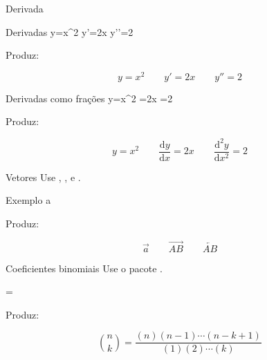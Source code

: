 \begin{frame}{Derivada}
	\begin{Codigo}{Derivadas}
		y=x\string^2  y'=2x  y'{}'=2
	\end{Codigo}
	
	\pause
	Produz:
	
	\begin{Resultado}{}
		\[y=x^2 \qquad y'=2x \qquad y''=2\]
	\end{Resultado}

    \pause
	\begin{Codigo}{Derivadas como frações}
		y=x\string^2  =2x  =2
	\end{Codigo}
	
	\pause
	Produz:
	
	\begin{Resultado}{}
		\[
		y=x^2 \qquad \frac{\mathrm{d}y}{\mathrm{d}x} =2x 	\qquad \frac{\mathrm{d}^2y}{\mathrm{d}x^2} =2
		\]
	\end{Resultado}
\end{frame}

\begin{frame}{Vetores}
	Use , , e . 

    \pause
	\begin{Codigo}{Exemplo}
		 a \qquad {} \qquad
	\end{Codigo}
	
	\pause
	Produz:
	
	\begin{Resultado}{}
		\[\vec a \qquad \overrightarrow{AB} \qquad \overleftarrow{AB}\]
	\end{Resultado}
\end{frame}

\begin{frame}{Coeficientes binomiais}
	Use o pacote .

	\begin{Codigo}{}
		 = \n
		\null\qquad{}
	\end{Codigo}
	
	\pause
	Produz:
	
	\begin{Resultado}{}
		\[\binom{n}{k} = \frac{(n)(n-1)\cdots(n-k+1)}{(1)(2)\cdots(k)}\]
	\end{Resultado}
\end{frame}

